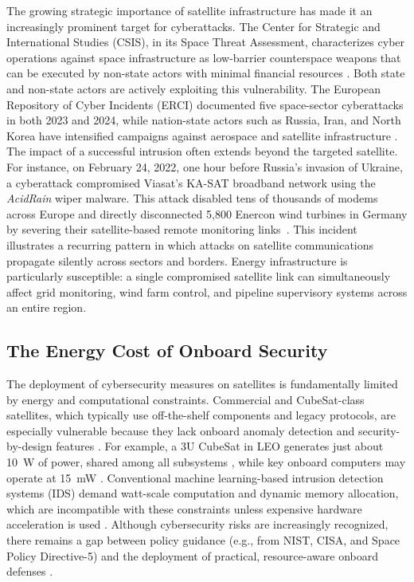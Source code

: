 The growing strategic importance of satellite infrastructure has made it an increasingly prominent target for cyberattacks. The Center for Strategic and International Studies (CSIS), in its Space Threat Assessment, characterizes cyber operations against space infrastructure as low-barrier counterspace weapons that can be executed by non-state actors with minimal financial resources \cite{CSIS2023}. Both state and non-state actors are actively exploiting this vulnerability. The European Repository of Cyber Incidents (ERCI) documented five space-sector cyberattacks in both 2023 and 2024, while nation-state actors such as Russia, Iran, and North Korea have intensified campaigns against aerospace and satellite infrastructure \cite{CSIS2025}. The impact of a successful intrusion often extends beyond the targeted satellite. For instance, on February 24, 2022, one hour before Russia's invasion of Ukraine, a cyberattack compromised Viasat's KA-SAT broadband network using the \textit{AcidRain} wiper malware. This attack disabled tens of thousands of modems across Europe and directly disconnected 5,800 Enercon wind turbines in Germany by severing their satellite-based remote monitoring links~\cite{Viasat2022, SentinelOne2022}. This incident illustrates a recurring pattern in which attacks on satellite communications propagate silently across sectors and borders. Energy infrastructure is particularly susceptible: a single compromised satellite link can simultaneously affect grid monitoring, wind farm control, and pipeline supervisory systems across an entire region.

\subsection{The Energy Cost of Onboard Security}

The deployment of cybersecurity measures on satellites is fundamentally limited by energy and computational constraints. Commercial and CubeSat-class satellites, which typically use off-the-shelf components and legacy protocols, are especially vulnerable because they lack onboard anomaly detection and security-by-design features \cite{LSE2023, ENISA2025}. For example, a 3U CubeSat in LEO generates just about 10~W of power, shared among all subsystems \cite{Nason2002, Arnold2012}, while key onboard computers may operate at 15~mW \cite{S4Space}. Conventional machine learning-based intrusion detection systems (IDS) demand watt-scale computation and dynamic memory allocation, which are incompatible with these constraints unless expensive hardware acceleration is used \cite{Arnold2012}. Although cybersecurity risks are increasingly recognized, there remains a gap between policy guidance (e.g., from NIST, CISA, and Space Policy Directive-5) and the deployment of practical, resource-aware onboard defenses \cite{NewSpace2024, NIST2022, SPD52020}.

